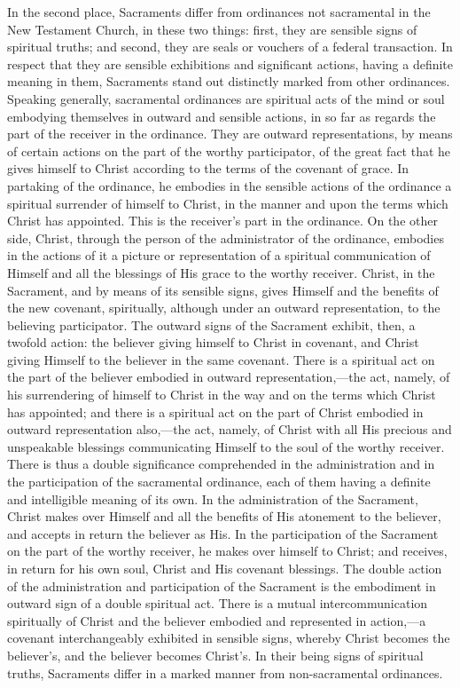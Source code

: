 \documentclass[]{book}
\begin{document}
In the second place, Sacraments differ from ordinances not sacramental in the New Testament Church, in these two things: first, they are sensible signs of spiritual truths; and second, they are seals or vouchers of a federal transaction. In respect that they are sensible exhibitions and significant actions, having a definite meaning in them, Sacraments stand out distinctly marked from other ordinances. Speaking generally, sacramental ordinances are spiritual acts of the mind or soul embodying themselves in outward and sensible actions, in so far as regards the part of the receiver in the ordinance. They are outward representations, by means of certain actions on the part of the worthy participator, of the great fact that he gives himself to Christ according to the terms of the covenant of grace. In partaking of the ordinance, he embodies in the sensible actions of the ordinance a spiritual surrender of himself to Christ, in the manner and upon the terms which Christ has appointed. This is the receiver's part in the ordinance. On the other side, Christ, through the person of the administrator of the ordinance, embodies in the actions of it a picture or representation of a spiritual communication of Himself and all the blessings of His grace to the worthy receiver. Christ, in the Sacrament, and by means of its sensible signs, gives Himself and the benefits of the new covenant, spiritually, although under an outward representation, to the believing participator. The outward signs of the Sacrament exhibit, then, a twofold action: the believer giving himself to Christ in covenant, and Christ giving Himself to the believer in the same covenant. There is a spiritual act on the part of the believer embodied in outward representation,---the act, namely, of his surrendering of himself to Christ in the way and on the terms which Christ has appointed; and there is a spiritual act on the part of Christ embodied in outward representation also,---the act, namely, of Christ with all His precious and unspeakable blessings communicating Himself to the soul of the worthy receiver. There is thus a double significance comprehended in the administration and in the participation of the sacramental ordinance, each of them having a definite and intelligible meaning of its own. In the administration of the Sacrament, Christ makes over Himself and all the benefits of His atonement to the believer, and accepts in return the believer as His. In the participation of the Sacrament on the part of the worthy receiver, he makes over himself to Christ; and receives, in return for his own soul, Christ and His covenant blessings. The double action of the administration and participation of the Sacrament is the embodiment in outward sign of a double spiritual act. There is a mutual intercommunication spiritually of Christ and the believer embodied and represented in action,---a covenant interchangeably exhibited in sensible signs, whereby Christ becomes the believer's, and the believer becomes Christ's. In their being signs of spiritual truths, Sacraments differ in a marked manner from non-sacramental ordinances.
\end{document}
